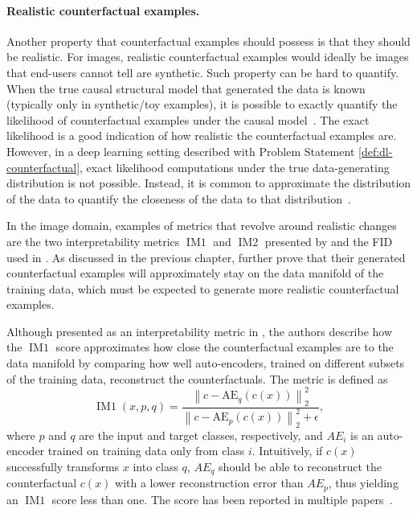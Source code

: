 \documentclass[11pt,a4paper,twoside,openright,final]{memoir}
\begin{document}
\paragraph{Realistic counterfactual examples.} 
Another property that counterfactual examples should possess is that they should be realistic.
For images, realistic counterfactual examples would ideally be images that end-users cannot tell are synthetic. 
Such property can be hard to quantify.
%
When the true causal structural model that generated the data is known (typically only in synthetic/toy examples), it is possible to exactly quantify the likelihood of counterfactual examples under the causal model~\cite{Mahajan2019}. 
The exact likelihood is a good indication of how realistic the counterfactual examples are. 
However, in a deep learning setting described with Problem Statement \ref{def:dl-counterfactual}, exact likelihood computations under the true data-generating distribution is not possible. 
Instead, it is common to approximate the distribution of the data to quantify the closeness of the data to that distribution~\cite{VanLooveren2019, flowcounterfactuals, Singla2019, Rodriguez2021}.

In the image domain, examples of metrics that revolve around realistic changes are the two interpretability metrics $\operatorname{IM1}$ and $\operatorname{IM2}$ presented by \citet{VanLooveren2019} and the FID used in \cite{Singla2019, Rodriguez2021}. 
As discussed in the previous chapter, \citet{flowcounterfactuals} further prove that their generated counterfactual examples will approximately stay on the data manifold of the training data, which must be expected to generate more realistic counterfactual examples.

Although presented as an interpretability metric in \cite{VanLooveren2019}, the authors describe how the $\operatorname{IM1}$ score approximates how close the counterfactual examples are to the data manifold by comparing how well auto-encoders, trained on different subsets of the training data, reconstruct the counterfactuals. 
The metric is defined as 
\begin{equation} 
    \label{eq:IM1} 
  \operatorname{IM1}\left( x, p, q \right) = 
        \frac{
            \left\|c-\mathrm{AE}_{q}(c(x))\right\|_{2}^{2}}
        {
            \left\|c-\mathrm{AE}_{p}(c(x))\right\|_{2}^{2}+\epsilon
        },
\end{equation}
where $p$ and $q$ are the input and target classes, respectively, and $AE_i$ is an auto-encoder trained on training data only from class $i$. 
Intuitively, if $c(x)$ successfully transforms $x$ into class $q$, $AE_q$ should be able to reconstruct the counterfactual $c(x)$ with a lower reconstruction error than $AE_p$, thus yielding an $\operatorname{IM1}$ score less than one.
The score has been reported in multiple papers~\cite{VanLooveren2019, Mahajan2019, Schut2021}. 
\end{document}
